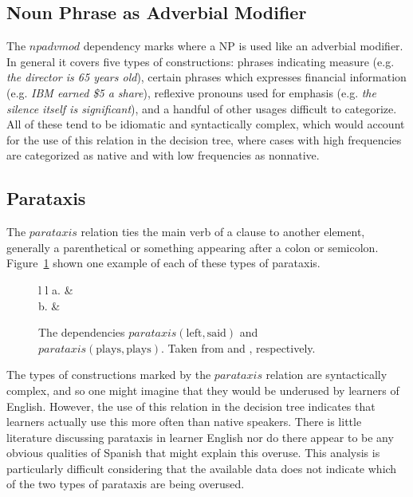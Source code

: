 \documentclass[main.tex]{subfiles}
\begin{document}
\subsection{Noun Phrase as Adverbial Modifier}

The $npadvmod$ dependency marks where a NP is used like an adverbial modifier. In general it covers five types of constructions: phrases indicating measure (e.g. \textit{the director is 65 years old}), certain phrases which expresses financial information (e.g. \textit{IBM earned \$5 a share}), reflexive pronouns used for emphasis (e.g. \textit{the silence itself is significant}), and a handful of other usages difficult to categorize. All of these tend to be idiomatic and syntactically complex, which would account for the use of this relation in the decision tree, where cases with high frequencies are categorized as native and with low frequencies as nonnative.

\subsection{Parataxis}

The $parataxis$ relation ties the main verb of a clause to another element, generally a parenthetical or something appearing after a colon or semicolon. Figure~\ref{fig:parataxis} shown one example of each of these types of parataxis.
\begin{figure}[htbp]
\centering
\begin{tabular}{ l l }
a. & \\
b. & \\
\end{tabular}
\caption{The dependencies $parataxis(\text{left}, \text{said})$ and $parataxis(\text{plays}, \text{plays})$. Taken from \citet{typed-deps-manual} and \citet[Ch. 13.7]{quirk:1985}, respectively.}
\label{fig:parataxis}
\end{figure}
The types of constructions marked by the $parataxis$ relation are syntactically complex, and so one might imagine that they would be underused by learners of English. However, the use of this relation in the decision tree indicates that learners actually use this more often than native speakers. There is little literature discussing parataxis in learner English nor do there appear to be any obvious qualities of Spanish that might explain this overuse. This analysis is particularly difficult considering that the available data does not indicate which of the two types of parataxis are being overused.
\end{document}
